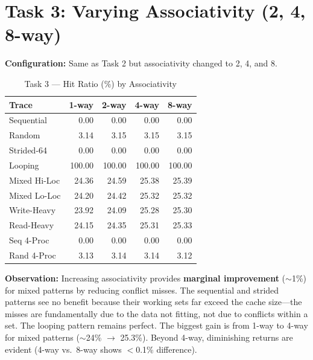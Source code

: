 \documentclass[12pt,a4paper]{article}
\begin{document}
\section{Task 3: Varying Associativity (2, 4, 8-way)}

\textbf{Configuration:} Same as Task 2 but associativity changed to 2, 4, and 8.

\begin{table}[H]
\centering
\caption{Task 3 --- Hit Ratio (\%) by Associativity}
\begin{tabular}{lrrrr}
\toprule
\textbf{Trace} & \textbf{1-way} & \textbf{2-way} & \textbf{4-way} & \textbf{8-way} \\
\midrule
Sequential     & 0.00  & 0.00  & 0.00  & 0.00  \\
Random         & 3.14  & 3.15  & 3.15  & 3.15  \\
Strided-64     & 0.00  & 0.00  & 0.00  & 0.00  \\
Looping        & 100.00& 100.00& 100.00& 100.00\\
Mixed Hi-Loc   & 24.36 & 24.59 & 25.38 & 25.39 \\
Mixed Lo-Loc   & 24.20 & 24.42 & 25.32 & 25.32 \\
Write-Heavy    & 23.92 & 24.09 & 25.28 & 25.30 \\
Read-Heavy     & 24.15 & 24.35 & 25.31 & 25.33 \\
Seq 4-Proc     & 0.00  & 0.00  & 0.00  & 0.00  \\
Rand 4-Proc    & 3.13  & 3.14  & 3.14  & 3.12  \\
\bottomrule
\end{tabular}
\end{table}

\textbf{Observation:} Increasing associativity provides \textbf{marginal improvement} ($\sim$1\%) for mixed patterns by reducing conflict misses. The sequential and strided patterns see no benefit because their working sets far exceed the cache size---the misses are fundamentally due to the data not fitting, not due to conflicts within a set. The looping pattern remains perfect. The biggest gain is from 1-way to 4-way for mixed patterns ($\sim$24\% $\to$ 25.3\%). Beyond 4-way, diminishing returns are evident (4-way vs.\ 8-way shows $<$0.1\% difference).

\end{document}
